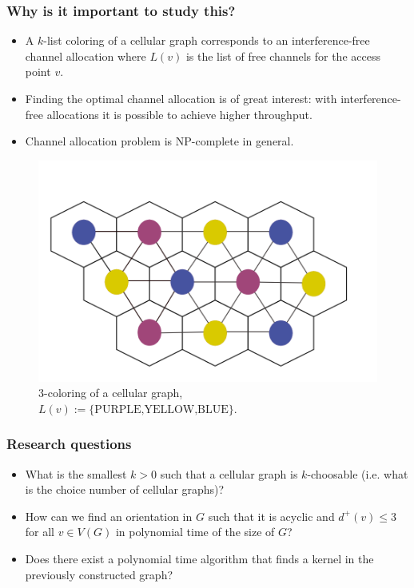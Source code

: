 \documentclass{beamer}
\begin{document}
\begin{frame}
\frametitle{Why is it important to study this?}
\justifying
\begin{itemize}
\item A $k$-list coloring of a cellular graph corresponds to an interference-free channel allocation where $L(v)$ is the list of free channels for the access point $v$.
\pause \item Finding the optimal channel allocation is of great interest: with interference-free allocations it is possible to achieve higher throughput.
\pause \item Channel allocation problem is $\mathrm{NP}$-complete in general.
\end{itemize}
\begin{figure}
\caption{3-coloring of a cellular graph, $L(v):=\lbrace \text{PURPLE,YELLOW,BLUE} \rbrace.$}
\includegraphics[scale=0.15]{3_coloring_cellular.png}
\end{figure}
\end{frame}

\begin{frame}
\frametitle{Research questions}
\justifying
\begin{itemize}
\item What is the smallest $k > 0$ such that a cellular graph is $k$-choosable (i.e. what is the choice number of cellular graphs)?
\pause \item How can we find an orientation in $G$ such that it is acyclic and $d^+(v) \leqslant 3$ for all $v \in V(G)$ in polynomial time of the size of $G$?
\pause \item Does there exist a polynomial time algorithm that finds a kernel in the previously constructed graph?

\end{itemize}
\end{frame}
\end{document}

